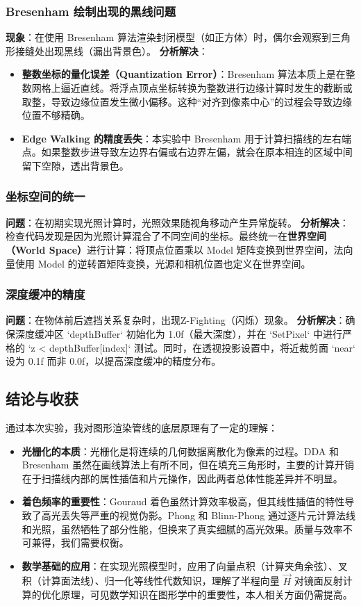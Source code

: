 \documentclass[a4paper]{article}
\begin{document}
\subsubsection{Bresenham 绘制出现的黑线问题}
\textbf{现象}：在使用 Bresenham 算法渲染封闭模型（如正方体）时，偶尔会观察到三角形接缝处出现黑线（漏出背景色）。
\textbf{分析解决}：
\begin{itemize}
    \item \textbf{整数坐标的量化误差（Quantization Error）}：Bresenham 算法本质上是在整数网格上逼近直线。将浮点顶点坐标转换为整数进行边缘计算时发生的截断或取整，导致边缘位置发生微小偏移。这种“对齐到像素中心”的过程会导致边缘位置不够精确。
    \item \textbf{Edge Walking 的精度丢失}：本实验中 Bresenham 用于计算扫描线的左右端点。如果整数步进导致左边界右偏或右边界左偏，就会在原本相连的区域中间留下空隙，透出背景色。
\end{itemize}

\subsubsection{坐标空间的统一}
\textbf{问题}：在初期实现光照计算时，光照效果随视角移动产生异常旋转。
\textbf{分析解决}：检查代码发现是因为光照计算混合了不同空间的坐标。最终统一在\textbf{世界空间（World Space）}进行计算：将顶点位置乘以 Model 矩阵变换到世界空间，法向量使用 Model 的逆转置矩阵变换，光源和相机位置也定义在世界空间。

\subsubsection{深度缓冲的精度}
\textbf{问题}：在物体前后遮挡关系复杂时，出现Z-Fighting（闪烁）现象。
\textbf{分析解决}：确保深度缓冲区 `depthBuffer` 初始化为 1.0f（最大深度），并在 `SetPixel` 中进行严格的 `z < depthBuffer[index]` 测试。同时，在透视投影设置中，将近裁剪面 `near` 设为 0.1f 而非 0.0f，以提高深度缓冲的精度分布。

\subsection{结论与收获}
通过本次实验，我对图形渲染管线的底层原理有了一定的理解：
\begin{itemize}
    \item \textbf{光栅化的本质}：光栅化是将连续的几何数据离散化为像素的过程。DDA 和 Bresenham 虽然在画线算法上有所不同，但在填充三角形时，主要的计算开销在于扫描线内部的属性插值和片元操作，因此两者总体性能差异并不明显。
    \item \textbf{着色频率的重要性}：Gouraud 着色虽然计算效率极高，但其线性插值的特性导致了高光丢失等严重的视觉伪影。Phong 和 Blinn-Phong 通过逐片元计算法线和光照，虽然牺牲了部分性能，但换来了真实细腻的高光效果。质量与效率不可兼得，我们需要权衡。
    \item \textbf{数学基础的应用}：在实现光照模型时，应用了向量点积（计算夹角余弦）、叉积（计算面法线）、归一化等线性代数知识，理解了半程向量 $\vec{H}$ 对镜面反射计算的优化原理，可见数学知识在图形学中的重要性，本人相关方面仍需提高。
\end{itemize}
\end{document}
